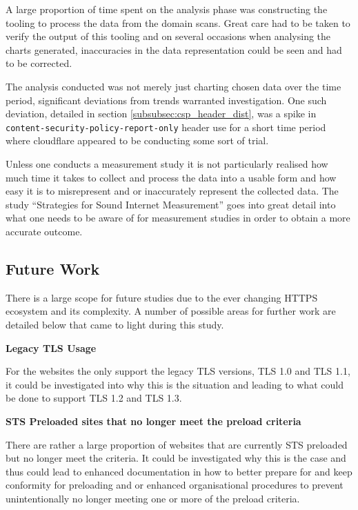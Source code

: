 \documentclass{mscreport}
\begin{document}
\noindent
A large proportion of time spent on the analysis phase was constructing the tooling to process the data from the domain scans. Great care had to be taken to verify the output of this tooling and on several occasions when analysing the charts generated, inaccuracies in the data representation could be seen and had to be corrected.

\vspace{0.3cm} \noindent
The analysis conducted was not merely just charting chosen data over the time period, significant deviations from trends warranted investigation. One such deviation, detailed in section \ref{subsubsec:csp_header_dist}, was a spike in \texttt{content-security-policy-report-only} header use for a short time period where cloudflare appeared to be conducting some sort of trial.


\vspace{0.3cm} \noindent
Unless one conducts a measurement study it is not particularly realised how much time it takes to collect and process the data into a usable form and how easy it is to misrepresent and or inaccurately represent the collected data. The study ``Strategies for Sound Internet Measurement'' \cite{Paxson2004-hq} goes into great detail into what one needs to be aware of for measurement studies in order to obtain a more accurate outcome.

\subsection{Future Work}

\noindent
There is a large scope for future studies due to the ever changing HTTPS ecosystem and its complexity. A number of possible areas for further work are detailed below that came to light during this study.

\vspace{0.7cm} \noindent
\textbf{Legacy TLS Usage}

\noindent
For the websites the only support the legacy TLS versions, TLS 1.0 and TLS 1.1, it could be investigated into why this is the situation and leading to what could be done to support TLS 1.2 and TLS 1.3.

\vspace{0.7cm} \noindent
\textbf{STS Preloaded sites that no longer meet the preload criteria}

\noindent
There are rather a large proportion of websites that are currently STS preloaded but no longer meet the criteria. It could be investigated why this is the case and thus could lead to enhanced documentation in how to better prepare for and keep conformity for preloading and or enhanced organisational procedures to prevent unintentionally no longer meeting one or more of the preload criteria.
\end{document}
